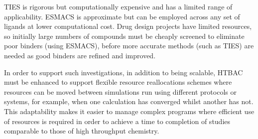 TIES is rigorous but computationally expensive and has a limited range of 
applicability.
ESMACS is approximate but can be employed across any set of ligands at lower 
computational cost.
Drug design projects have limited resources,
so initially large numbers of compounds must be cheaply screened
to eliminate poor binders (using ESMACS), 
before more accurate methods (such as
TIES) are needed as good binders are refined and improved. %

In order to support such
investigations, in addition to being scalable, HTBAC must be enhanced to
support flexible resource reallocations schemes where resources can be moved
between simulations run using different protocols or systems, for example,
when one calculation has converged whilst another has not. This adaptability
makes it easier to manage complex programs where efficient use of resources
is required in order to achieve a time to completion of studies comparable to
those of high throughput chemistry. 






